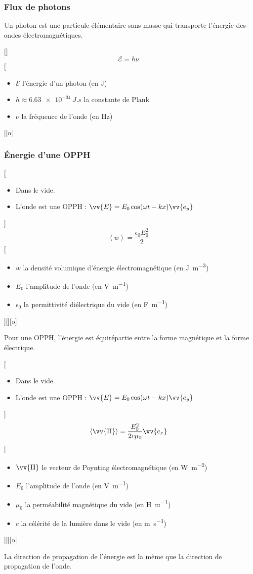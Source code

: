\subsubsection{Flux de photons}
Un photon est une particule élémentaire sans masse qui transporte l'énergie des ondes électromagnétiques.

[]
{$$\mathcal{E}=h\nu$$}
[
    \begin{itemize}
        \item $\mathcal{E}$ l'énergie d'un photon (en \unit{J})
        \item $h\approx\SI{6.63e-34}{J.s}$ la constante de Plank
        \item $\nu$ la fréquence de l'onde (en \unit{Hz})
    \end{itemize}
][o]


\subsubsection{Énergie d'une OPPH}
[
    \begin{itemize}
        \item Dans le vide.
        \item L'onde est une OPPH : $\vv{E}=E_0\cos(\omega t-kx)\vv{e_y}$
    \end{itemize}
]
{
    $$\left< w\right>=\frac{\epsilon_0 E_0^2}{2}$$
}
[
    \begin{itemize}
        \item $w$ la densité volumique d'énergie électromagnétique (en \unit{J.m^{-3}})
        \item $E_0$ l'amplitude de l'onde (en \unit{V.m^{-1}})
        \item $\epsilon_0$ la permittivité diélectrique du vide (en \unit{F.m^{-1}})
    \end{itemize}
][][o]

Pour une OPPH, l'énergie est équirépartie entre la forme magnétique et la forme électrique.

[
    \begin{itemize}
        \item Dans le vide.
        \item L'onde est une OPPH : $\vv{E}=E_0\cos(\omega t-kx)\vv{e_y}$
    \end{itemize}
]
{
    $$\left<\vv{\Pi}\right>=\frac{E_0^2}{2c\mu_0}\vv{e_x}$$
}
[
    \begin{itemize}
        \item $\vv{\Pi}$ le vecteur de Poynting électromagnétique (en \unit{W.m^{-2}})
        \item $E_0$ l'amplitude de l'onde (en \unit{V.m^{-1}})
        \item $\mu_0$ la perméabilité magnétique du vide (en \unit{H.m^{-1}})
        \item $c$ la célérité de la lumière dans le vide (en \unit{m.s^{-1}})
    \end{itemize}
][][o]

La direction de propagation de l'énergie est la même que la direction de propagation de l'onde.